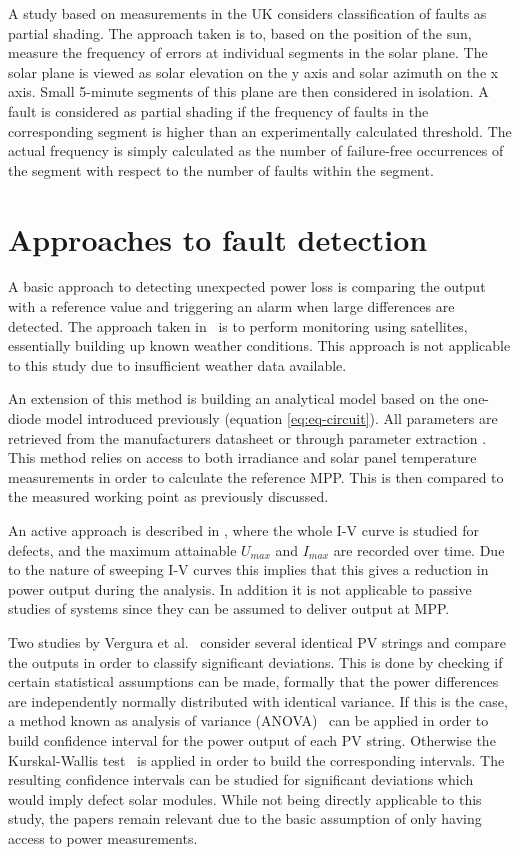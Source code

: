 A study based on measurements in the UK \cite{Firth2010} considers classification of faults as partial shading.
The approach taken is to, based on the position of the sun, measure the frequency of errors at individual segments in the solar plane.
The solar plane is viewed as solar elevation on the y axis and solar azimuth on the x axis.
Small 5-minute segments of this plane are then considered in isolation.
A fault is considered as partial shading if the frequency of faults in the corresponding segment is higher than an experimentally calculated threshold.
The actual frequency is simply calculated as the number of failure-free occurrences of the segment with respect to the number of faults within the segment.

\clearpage
\section{Approaches to fault detection}
A basic approach to detecting unexpected power loss is comparing the output with a reference value and triggering an alarm when large differences are detected.
The approach taken in~\cite{Stettler2005} is to perform monitoring using satellites, essentially building up known weather conditions.
This approach is not applicable to this study due to insufficient weather data available.

An extension of this method is building an analytical model \cite{Chouder2010,Raina2013,Chao2008}
based on the one-diode model introduced previously (equation \ref{eq:eq-circuit}).
All parameters are retrieved from the manufacturers datasheet or through parameter extraction \cite{Eicker2005,Chouder2009,Walker2001}.
This method relies on access to both irradiance and solar panel temperature measurements in order to calculate the reference MPP.
This is then compared to the measured working point as previously discussed.

An active approach is described in \cite{Meyer2004}, where the whole I-V curve is studied for defects, and the maximum attainable $U_{max}$ and $I_{max}$ are recorded over time.
Due to the nature of sweeping I-V curves this implies that this gives a reduction in power output during the analysis.
In addition it is not applicable to passive studies of systems since they can be assumed to deliver output at MPP.

Two studies by Vergura et al.~\cite{Vergura2008,Vergura2009} consider several identical PV strings and compare the outputs in order to classify significant deviations.
This is done by checking if certain statistical assumptions can be made, formally that the power differences are independently normally distributed with identical variance.
If this is the case, a method known as analysis of variance (ANOVA)~\cite{Vergura2009} can be applied in order to build confidence interval for the power output of each PV string.
Otherwise the Kurskal-Wallis test~\cite{Vergura2009} is applied in order to build the corresponding intervals.
The resulting confidence intervals can be studied for significant deviations which would imply defect solar modules.
While not being directly applicable to this study, the papers remain relevant due to the basic assumption of only having access to power measurements.

